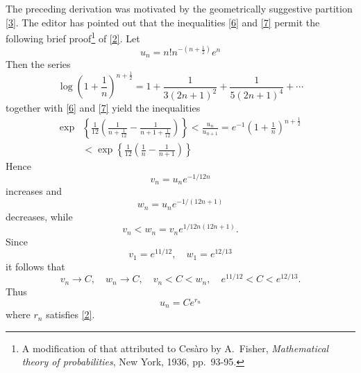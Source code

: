 \documentclass[leqno]{article}
\begin{document}
The preceding derivation was motivated by the geometrically suggestive partition \eqref{3}. The editor has pointed out that the inequalities \eqref{6} and \eqref{7} permit the following brief proof\footnote{A modification of that attributed to Cesàro by A.\ Fisher, \emph{Mathematical theory of probabilities}, New York, 1936, pp.\ 93-95.} of \eqref{2}. Let
\begin{equation*}
	u_{n}=n ! n^{-\left(n+\frac 12\right)} e^{n}
\end{equation*}
Then the series
\begin{equation*}
	\log \left(1+\frac{1}{n}\right)^{n+\frac 12}=1+\frac{1}{3(2 n+1)^{2}}+\frac{1}{5(2 n+1)^{4}}+\cdots
\end{equation*}
together with \eqref{6} and \eqref{7} yield the inequalities
\begin{equation*}
	\begin{split}
		\exp & \left\{\frac{1}{12}\left(\frac{1}{n+\frac{1}{12}}-\frac{1}{n+1+\frac{1}{12}}\right)\right\}<\frac{u_{n}}{u_{n+1}}=e^{-1}\left(1+\frac{1}{n}\right)^{n+\frac 12} \\
		& <\exp \left\{\frac{1}{12}\left(\frac{1}{n}-\frac{1}{n+1}\right)\right\}
	\end{split}
\end{equation*}
Hence
\begin{equation*}
	v_{n}=u_{n} e^{-1 / 12 n}
\end{equation*}
increases and
\begin{equation*}
	w_{n}=u_{n} e^{-1 /(12 n+1)}
\end{equation*}
decreases, while
\begin{equation*}
	v_{n}<w_{n}=v_{n} e^{1 / 12 n(12 n+1)}.
\end{equation*}
Since
\begin{equation*}
	v_1 = e^{11/12}, \quad w_1 = e^{12/13}
\end{equation*}
it follows that
\begin{equation*}
	v_n \to C, \quad w_n \to C, \quad v_n < C < w_n, \quad e^{11/12} < C <  e^{12/13}.
\end{equation*}
Thus
\begin{equation*}
	u_n = C e^{r_n}
\end{equation*}
where $r_n$ satisfies \eqref{2}.
\end{document}
